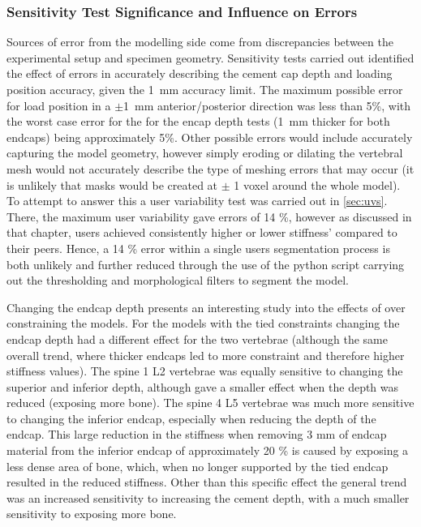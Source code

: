 \subsubsection{Sensitivity Test Significance and Influence on Errors}

Sources of error from the modelling side come from discrepancies between the
experimental setup and specimen geometry. Sensitivity tests carried out
identified the effect of errors in accurately describing the cement cap depth
and loading position accuracy, given the 1~mm accuracy limit. The maximum
possible error for load position in a $\pm$1~mm anterior/posterior direction
was less than 5\%, with the worst case error for the for the encap depth tests
(1~mm thicker for both endcaps) being approximately 5\%. Other possible errors
would include accurately capturing the model geometry, however simply eroding
or dilating the vertebral mesh would not accurately describe the type of
meshing errors that may occur (it is unlikely that masks would be created at
$\pm$ 1 voxel around the whole model). To attempt to answer this a user
variability test was carried out in \cref{sec:uvs}. There, the maximum user
variability gave errors of 14 \%, however as discussed in that chapter, users
achieved consistently higher or lower stiffness' compared to their peers.
Hence, a 14 \% error within a single users segmentation process is both
unlikely and further reduced through the use of the python script carrying out
the thresholding and morphological filters to segment the model.

Changing the endcap depth presents an interesting study into the effects of
over constraining the models. For the models with the tied constraints changing
the endcap depth had a different effect for the two vertebrae (although the
same overall trend, where thicker endcaps led to more constraint and therefore
higher stiffness values). The spine 1 L2 vertebrae was equally sensitive to
changing the superior and inferior depth, although gave a smaller effect when
the depth was reduced (exposing more bone). The spine 4 L5 vertebrae was much
more sensitive to changing the inferior endcap, especially when reducing the
depth of the endcap. This large reduction in the stiffness when removing 3 mm
of endcap material from the inferior endcap of approximately 20 \% is caused by
exposing a less dense area of bone, which, when no longer supported by the tied
endcap resulted in the reduced stiffness. Other than this specific effect the
general trend was an increased sensitivity to increasing the cement depth, with
a much smaller sensitivity to exposing more bone.

